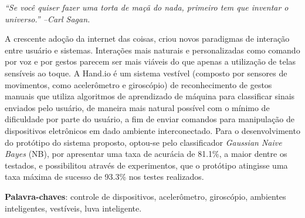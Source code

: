 \documentclass[
	12pt,				%
    oneside,
	a4paper,			%
	chapter=TITLE,		%
	english,			%
	brazil				%
	]{abntex2}
\begin{document}

\begin{epigrafe}
    \vspace*{\fill}
	\begin{flushright}
		\textit{``Se você quiser fazer uma torta de maçã do nada, primeiro tem que inventar o universo.'' --Carl Sagan.}
	\end{flushright}
\end{epigrafe}


\setlength{\absparsep}{18pt} %
\begin{resumo}[Resumo]
    A crescente adoção da internet das coisas, criou novos paradigmas de interação entre usuário e sistemas. Interações mais naturais e personalizadas como comando por voz e por gestos parecem ser mais viáveis do que apenas a utilização de telas sensíveis ao toque. A Hand.io é um sistema vestível (composto por sensores de movimentos, como acelerômetro e giroscópio) de reconhecimento de gestos manuais que utiliza algoritmos de aprendizado de máquina para classificar sinais enviados pelo usuário, de maneira mais natural possível com o mínimo de dificuldade por parte do usuário, a fim de enviar comandos para manipulação de dispositivos eletrônicos em dado ambiente interconectado. Para o desenvolvimento do protótipo do sistema proposto, optou-se pelo classificador \textit{Gaussian Naive Bayes} (NB), por apresentar uma taxa de acurácia de 81.1\%, a maior dentre os testados, e possibilitou através de experimentos, que o protótipo atingisse uma taxa máxima de sucesso de 93.3\% nos testes realizados.
    \vspace{\onelineskip}
 
    \noindent 
    \textbf{Palavra-chaves}: controle de dispositivos, acelerômetro, giroscópio, ambientes inteligentes, vestíveis, luva inteligente.
\end{resumo}
\end{document}

